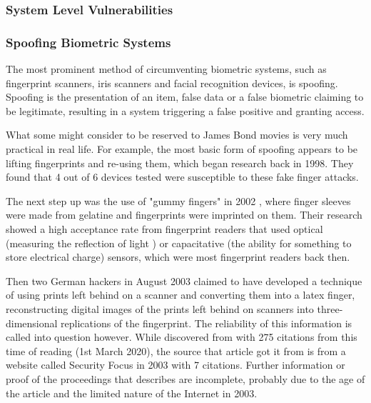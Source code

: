 \documentclass[a4paper, 11pt]{article}
\begin{document}
\subsubsection{System Level Vulnerabilities}
\label{sec:systemlevel}

\subsubsection{Spoofing Biometric Systems}
\label{sec:spoofingbiometric}
The most prominent method of circumventing biometric systems, such as fingerprint scanners, iris scanners and facial recognition devices, is spoofing. \cite{ref:biometricattackvectors} Spoofing is the presentation of an item, false data or a false biometric claiming to be legitimate, resulting in a system triggering a false positive and granting access. \cite{ref:biometricattackvectors}

What some might consider to be reserved to James Bond movies is very much practical in real life. For example, the most basic form of spoofing appears to be lifting fingerprints and re-using them, which began research back in 1998. \cite{ref:biometricattackvectors,ref:willis1998six} They found that 4 out of 6 devices tested were susceptible to these fake finger attacks. \cite{ref:willis1998six}

The next step up was the use of "gummy fingers" in 2002 \cite{ref:matsumoto2002impact}, where finger sleeves were made from gelatine and fingerprints were imprinted on them. Their research showed a high acceptance rate from fingerprint readers that used optical (measuring the reflection of light \cite{ref:matsumoto2002impact}) or capacitative (the ability for something to store electrical charge) sensors, which were most fingerprint readers back then. \cite{ref:matsumoto2002impact}

Then two German hackers in August 2003 claimed to have developed a technique of using prints left behind on a scanner and converting them into a latex finger, reconstructing digital images of the prints left behind on scanners into three-dimensional replications of the fingerprint. \cite{ref:biometricattackvectors,ref:harrison2003hackers} The reliability of this information is called into question however. While discovered from \cite{ref:biometricattackvectors} with 275 citations from this time of reading (1st March 2020), the source that article got it from \cite{ref:harrison2003hackers} is from a website called Security Focus in 2003 with 7 citations. Further information or proof of the proceedings that \cite{ref:harrison2003hackers} describes are incomplete, probably due to the age of the article and the limited nature of the Internet in 2003.
\end{document}
